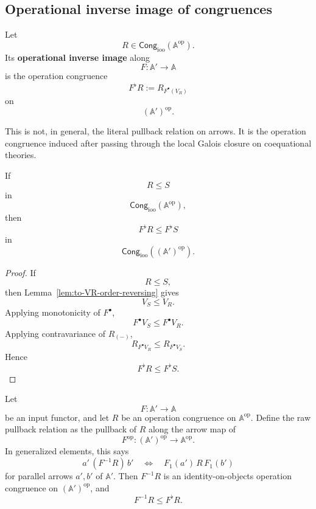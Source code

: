 \subsection{Operational inverse image of congruences}
\label{subsec:to-operational-inverse-image}

\begin{definition}
\label{def:to-operational-inverse-image-congruence}
    Let
    \[
        R\in
        \mathsf{Cong}_{\mathrm{ioo}}(\mathbb A^{\mathrm{op}}).
    \]
    Its \textbf{operational inverse image} along
    \[
        F:\mathbb A'\to\mathbb A
    \]
    is the operation congruence
    \[
        F^\flat R
        :=
        R_{F^\bullet(V_R)}
    \]
    on
    \[
        (\mathbb A')^{\mathrm{op}}.
    \]
\end{definition}

This is not, in general, the literal pullback relation on arrows. It is the
operation congruence induced after passing through the local Galois closure on
coequational theories.

\begin{lemma}
\label{lem:to-Fflat-monotone}
    If
    \[
        R\leq S
    \]
    in
    \[
        \mathsf{Cong}_{\mathrm{ioo}}(\mathbb A^{\mathrm{op}}),
    \]
    then
    \[
        F^\flat R\leq F^\flat S
    \]
    in
    \[
        \mathsf{Cong}_{\mathrm{ioo}}((\mathbb A')^{\mathrm{op}}).
    \]
\end{lemma}

\begin{proof}
    If
    \[
        R\leq S,
    \]
    then Lemma~\ref{lem:to-VR-order-reversing} gives
    \[
        V_S\leq V_R.
    \]
    Applying monotonicity of \(F^\bullet\),
    \[
        F^\bullet V_S\leq F^\bullet V_R.
    \]
    Applying contravariance of \(R_{(-)}\),
    \[
        R_{F^\bullet V_R}
        \leq
        R_{F^\bullet V_S}.
    \]
    Hence
    \[
        F^\flat R\leq F^\flat S.
    \]
\end{proof}

\begin{lemma}
\label{lem:to-raw-pullback-contained-Fflat}
    Let
    \[
        F:\mathbb A'\to\mathbb A
    \]
    be an input functor, and let \(R\) be an operation congruence on
    \(\mathbb A^{\mathrm{op}}\). Define the raw pullback relation as the pullback of \(R\) along the arrow map
    of
    \[
        F^{\mathrm{op}}:(\mathbb A')^{\mathrm{op}}\to\mathbb A^{\mathrm{op}}.
    \]
    In generalized elements, this says
    \[
        a'\,(F^{-1}R)\,b'
        \quad\Longleftrightarrow\quad
        F_1(a')\,R\,F_1(b')
    \]
    for parallel arrows \(a',b'\) of \(\mathbb A'\). Then \(F^{-1}R\) is an
    identity-on-objects operation congruence on \((\mathbb A')^{\mathrm{op}}\),
    and
    \[
        F^{-1}R\leq F^\flat R.
    \]
\end{lemma}

